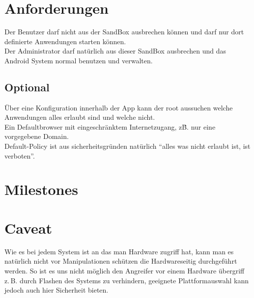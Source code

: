 \documentclass[12pt,a4paper,ngerman]{scrartcl}
\begin{document}
\section*{Anforderungen}
Der Benutzer darf nicht aus der SandBox ausbrechen können und darf nur dort definierte Anwendungen starten können. \\
Der Administrator darf natürlich aus dieser SandBox ausbrechen und das Android System normal benutzen und verwalten.

\subsection*{Optional}
Über eine Konfiguration innerhalb der App kann der root aussuchen welche Anwendungen alles erlaubt sind und welche nicht. \\
Ein Defaultbrowser mit eingeschränktem Internetzugang, z\.B. nur eine vorgegebene Domain. \\
Default-Policy ist aus sicherheitsgründen natürlich ``alles was nicht erlaubt ist, ist verboten''.

\section*{Milestones}


\section*{Caveat}
Wie es bei jedem System ist an das man Hardware zugriff hat, kann man es natürlich nicht vor Manipulationen schützen die Hardwareseitig durchgeführt werden. So ist es uns nicht möglich den Angreifer vor einem Hardware übergriff z.\,B. durch Flashen des Systems zu verhindern, geeignete Plattformauswahl kann jedoch auch hier Sicherheit bieten.
\end{document}

